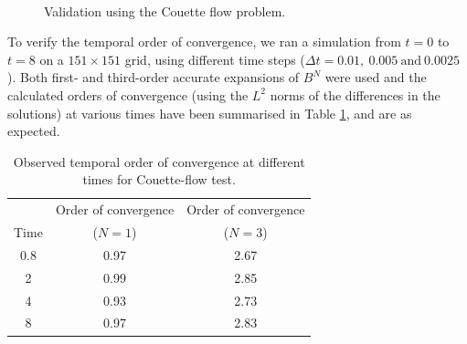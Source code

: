 \documentclass{tufte-handout}
\begin{document}
\begin{figure}
	\vspace{0.4cm}\\
	\caption{Validation using the Couette flow problem.}
	\label{fig:couette}
\end{figure}

To verify the temporal order of convergence, we ran a simulation from $t=0$ to $t=8$ on a $151\times 151$ grid, using different time steps ($\Delta{t}=0.01,~0.005~\text{and}~0.0025$). Both first- and third-order accurate expansions of $B^N$ were used and the calculated orders of convergence (using the $L^2$ norms of the differences in the solutions) at various times have been summarised in Table \ref{table:temporal}, and are as expected.

\begin{table}[h]
  \centering
  \selectfont
    \begin{tabular}{ c c c }
 \toprule
     & Order of convergence & Order of convergence \\
    Time & ($N=1$) & ($N=3$) \\ 
    \midrule
    0.8 & 0.97 & 2.67 \\ 
    2 & 0.99 & 2.85 \\ 
    4 & 0.93 & 2.73 \\ 
    8 & 0.97 & 2.83 \\ 
    \bottomrule
    \end{tabular}
    \caption{Observed temporal order of convergence at different times for Couette-flow test.}\vspace{0.25cm}
    \label{table:temporal}
\end{table}
\end{document}
